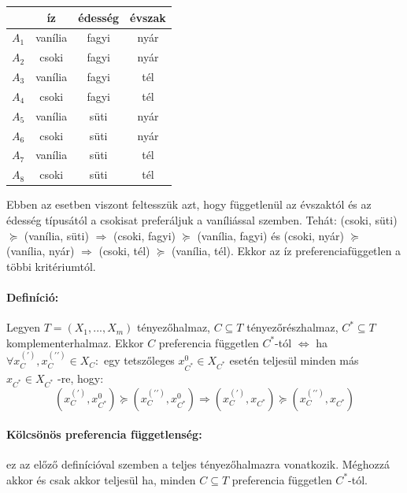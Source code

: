 \documentclass[a4paper,12pt]{article}
\begin{document}
\begin{center}
\begin{tabular}{c||c|c|c}
 & íz& édesség& évszak \\
 \hline
 $A_1$& vanília  & fagyi & nyár \\
 $A_2$& csoki  & fagyi & nyár \\
 $A_3$& vanília  & fagyi & tél \\
 $A_4$& csoki  & fagyi & tél \\
 $A_5$& vanília  & süti & nyár \\
 $A_6$& csoki  & süti & nyár \\
 $A_7$& vanília  & süti & tél \\
 $A_8$& csoki  & süti & tél \\
\end{tabular}
\end{center}

Ebben az esetben viszont feltesszük azt, hogy függetlenül az évszaktól és az édesség típusától a csokisat preferáljuk a vaníliással szemben. Tehát: (csoki, süti) $\succeq$ (vanília, süti) $\Rightarrow$ (csoki, fagyi) $\succeq$ (vanília, fagyi) és (csoki, nyár) $\succeq$ (vanília, nyár) $\Rightarrow$ (csoki, tél) $\succeq$ (vanília, tél). Ekkor az íz preferenciafüggetlen a többi kritériumtól. 


\paragraph{Definíció: } Legyen $T=(X_1,...,X_m)$ tényezőhalmaz, $C \subseteq T$ tényezőrészhalmaz,  $C^* \subseteq T $ komplementerhalmaz. Ekkor $C$ preferencia független $C^*$-tól $\Leftrightarrow$ ha $\forall x_C^{(\prime)}, x_C^{(\prime\prime)} \in X_C:$  egy tetszőleges $x_{C^{*}}^0 \in X_{C^*}$  esetén teljesül minden más $ x_{C^{*}} \in X_{C^*}$ -re, hogy:
\begin{equation}
(x_C^{(\prime)}, x_{C^{*}}^0) \succeq (x_C^{(\prime\prime)}, x_{C^{*}}^0) 
\Rightarrow
(x_C^{(\prime)}, x_{C^{*}}) \succeq (x_C^{(\prime\prime)}, x_{C^{*}}) 
\end{equation}

\paragraph{Kölcsönös preferencia függetlenség: } ez az előző definícióval szemben a teljes tényezőhalmazra vonatkozik. Méghozzá akkor és csak akkor teljesül ha, minden $C \subseteq T$ preferencia független $C^*$-tól.
\end{document}
